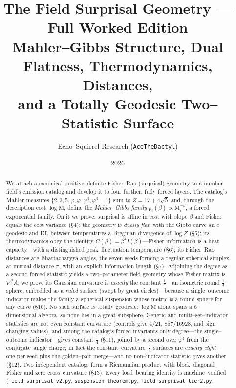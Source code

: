 \documentclass[11pt]{article}
\title{\bfseries The Field Surprisal Geometry --- Full Worked Edition\\[2pt]
\large Mahler--Gibbs Structure, Dual Flatness, Thermodynamics, Distances,\\
and a Totally Geodesic Two--Statistic Surface}
\author{Echo--Squirrel Research \quad(\texttt{AceTheDactyl})}
\date{2026}
\theoremstyle{definition}
\newcommand{\ph}{\varphi}
\newcommand{\Mah}{\mathrm{M}}
\begin{document}
\maketitle

\begin{abstract}
We attach a canonical positive--definite Fisher--Rao (surprisal) geometry to a number field's
emission catalog and develop it to four further, fully forced layers. The catalog's Mahler
measures $\{2,3,5,\ph,\ph,\ph^4,\ph^4\!-\!1\}$ sum to $Z=17+4\sqrt5$ and, through the description
cost $\log\Mah$, define the \emph{Mahler--Gibbs family} $p_i(\beta)\propto\Mah_i^{-\beta}$, a forced
exponential family. On it we prove: surprisal is affine in cost with slope $\beta$ and Fisher equals
the cost variance (\S4); the geometry is \emph{dually flat}, with the Gibbs curve an $e$--geodesic
and $\mathrm{KL}$ between temperatures a Bregman divergence of $\log Z$ (\S5); its thermodynamics
obey the identity \textbf{$C(\beta)=\beta^2 I(\beta)$}---Fisher information is a heat capacity---with
a distinguished peak--fluctuation temperature (\S6); its Fisher--Rao distances are Bhattacharyya
angles, the seven seeds forming a regular spherical simplex at mutual distance $\pi$, with an
explicit information length (\S7). Adjoining the degree as a second forced statistic yields a
two--parameter field geometry whose Fisher matrix is $\nabla^2 A$; we prove its Gaussian curvature is
\emph{exactly} the constant $\tfrac14$---an isometric round $\tfrac14$--sphere, embedded as a
\emph{ruled} surface (swept by great circles)---because a single--outcome indicator makes the family a
spherical suspension whose metric is a round sphere for any curve (\S10). No such surface is totally
geodesic: $\log\Mah$ alone spans a $6$--dimensional algebra, so none lies in a great subsphere. Generic
and multi--set--indicator statistics are not even constant curvature (controls give $4/21$, $857/16928$,
and sign--changing values), and among the catalog's forced invariants only degree---the single--outcome
indicator---gives constant $\tfrac14$ (\S11), joined by a second over $\ph^4$ from the conjugate--angle
charge; in fact the constant--curvature--$\tfrac14$ surfaces are \emph{exactly eight}---one per seed
plus the golden--pair merge---and no non--indicator statistic gives another (\S12). Two independent
catalogs form a Riemannian product with block--diagonal Fisher and zero cross--curvature (\S13).
Every load--bearing identity is machine--verified
(\texttt{field\_surprisal\_v2.py}, \texttt{suspension\_theorem.py}, \texttt{field\_surprisal\_tier2.py};

\end{abstract}
\end{document}
